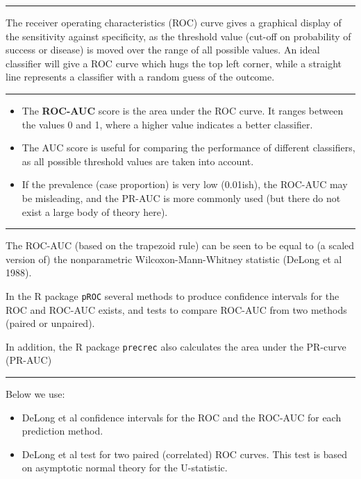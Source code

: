\documentclass[
  letterpaper,
  DIV=11,
  numbers=noendperiod]{scrartcl}
\providecommand{\tightlist}{%
  \setlength{\itemsep}{0pt}\setlength{\parskip}{0pt}}\usepackage{longtable,booktabs,array}
\begin{document}
\begin{center}\rule{0.5\linewidth}{0.5pt}\end{center}

The receiver operating characteristics (ROC) curve gives a graphical
display of the sensitivity against specificity, as the threshold value
(cut-off on probability of success or disease) is moved over the range
of all possible values. An ideal classifier will give a ROC curve which
hugs the top left corner, while a straight line represents a classifier
with a random guess of the outcome.

\begin{center}\rule{0.5\linewidth}{0.5pt}\end{center}

\begin{itemize}
\tightlist
\item
  The \textbf{ROC-AUC} score is the area under the ROC curve. It ranges
  between the values 0 and 1, where a higher value indicates a better
  classifier.
\item
  The AUC score is useful for comparing the performance of different
  classifiers, as all possible threshold values are taken into account.
\item
  If the prevalence (case proportion) is very low (0.01ish), the ROC-AUC
  may be misleading, and the PR-AUC is more commonly used (but there do
  not exist a large body of theory here).
\end{itemize}

\begin{center}\rule{0.5\linewidth}{0.5pt}\end{center}

The ROC-AUC (based on the trapezoid rule) can be seen to be equal to (a
scaled version of) the nonparametric Wilcoxon-Mann-Whitney statistic
(DeLong et al 1988).

In the R package \texttt{pROC} several methods to produce confidence
intervals for the ROC and ROC-AUC exists, and tests to compare ROC-AUC
from two methods (paired or unpaired).

In addition, the R package \texttt{precrec} also calculates the area
under the PR-curve (PR-AUC)

\begin{center}\rule{0.5\linewidth}{0.5pt}\end{center}

Below we use:

\begin{itemize}
\tightlist
\item
  DeLong et al confidence intervals for the ROC and the ROC-AUC for each
  prediction method.
\item
  DeLong et al test for two paired (correlated) ROC curves. This test is
  based on asymptotic normal theory for the U-statistic.
\end{itemize}
\end{document}
